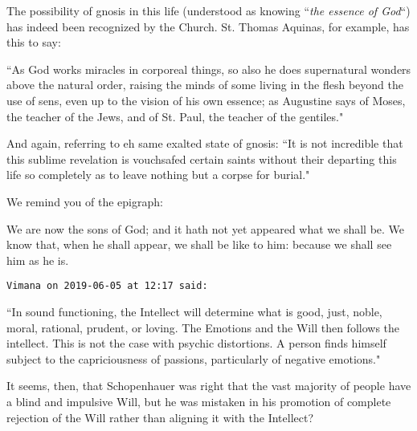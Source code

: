 \begin{footnotesize}
\begin{sffamily}
\begin{quotex}
The possibility of gnosis in this life (understood as knowing ``\emph{the essence of God}``) has indeed been recognized by the Church. St. Thomas Aquinas, for example, has this to say:

``As God works miracles in corporeal things, so also he does supernatural wonders above the natural order, raising the minds of some living in the flesh beyond the use of sens, even up to the vision of his own essence; as Augustine says of Moses, the teacher of the Jews, and of St. Paul, the teacher of the gentiles."

And again, referring to eh same exalted state of gnosis: ``It is not incredible that this sublime revelation is vouchsafed certain saints without their departing this life so completely as to leave nothing but a corpse for burial." 

\end{quotex}
We remind you of the epigraph:

We are now the sons of God; and it hath not yet appeared what we shall be. We know that, when he shall appear, we shall be like to him: because we shall see him as he is. 


\hfill

\texttt{Vimana on 2019-06-05 at 12:17 said: }

``In sound functioning, the Intellect will determine what is good, just, noble, moral, rational, prudent, or loving. The Emotions and the Will then follows the intellect. This is not the case with psychic distortions. A person finds himself subject to the capriciousness of passions, particularly of negative emotions."

It seems, then, that Schopenhauer was right that the vast majority of people have a blind and impulsive Will, but he was mistaken in his promotion of complete rejection of the Will rather than aligning it with the Intellect?


\end{sffamily}\end{footnotesize}
